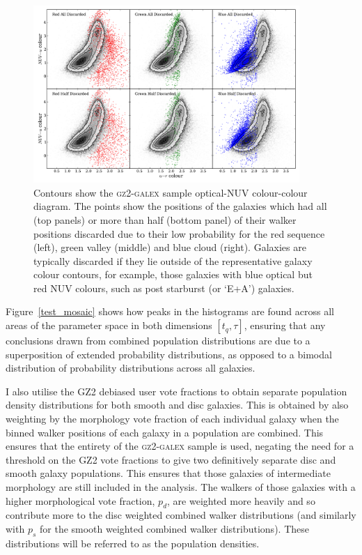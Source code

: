 \begin{figure}
\includegraphics[width=0.9\textwidth]{starpy/discarded_galaxy_colour_colour.pdf}
\caption[Colours of discarded galaxies]{Contours show the \textsc{gz2-galex} sample optical-NUV colour-colour diagram. The points show the positions of the galaxies which had all (top panels) or more than half (bottom panel) of their walker positions discarded due to their low probability for the red sequence (left), green valley (middle) and blue cloud (right). {\minor Galaxies are typically discarded if they lie outside of the representative galaxy colour contours, for example, those galaxies with blue optical but red NUV colours, such as post starburst (or `E+A') galaxies.}}
\label{discarded}
\end{figure}

Figure~\ref{test_mosaic} shows how peaks in the histograms are found across all areas of the parameter space in both dimensions $[t_q, \tau]$, ensuring that any conclusions drawn from combined population distributions are due to a superposition of extended probability distributions, as opposed to a bimodal distribution of probability distributions across all galaxies.

I also utilise the GZ2 debiased user vote fractions to obtain separate population density distributions for both smooth and disc galaxies. This is obtained by also weighting by the morphology vote fraction of each individual galaxy when the binned walker positions of each galaxy in a population are combined. This ensures that the entirety of the \textsc{gz2-galex} sample is used, negating the need for a threshold on the GZ2 vote fractions \citep[e.g., $p_d > 0.8$ as used in][]{schawinski14} to give two definitively separate disc and smooth galaxy populations. This ensures that those galaxies of intermediate morphology are still included in the analysis. The walkers of those galaxies with a higher morphological vote fraction, $p_d$, are weighted more heavily and so contribute more to the disc weighted combined walker distributions (and similarly with $p_s$ for the smooth weighted combined walker distributions). These distributions will be referred to as the population densities.

